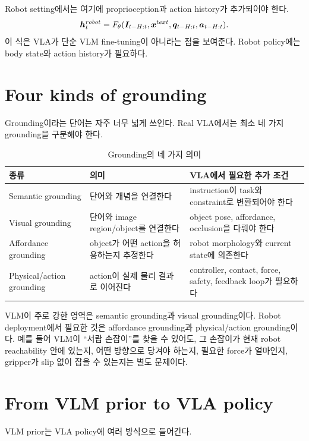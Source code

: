 Robot setting에서는 여기에 proprioception과 action history가 추가되어야 한다.
\begin{equation}
  \bm{h}^{robot}_t
  =
  F_{\theta}(\bm{I}_{t-H:t},\bm{x}^{text},\bm{q}_{t-H:t},\bm{a}_{t-H:t}).
  \label{eq:robot-multimodal-fusion}
\end{equation}
이 식은 VLA가 단순 VLM fine-tuning이 아니라는 점을 보여준다. Robot policy에는 body state와 action history가 필요하다.

\section{Four kinds of grounding}

Grounding이라는 단어는 자주 너무 넓게 쓰인다. Real VLA에서는 최소 네 가지 grounding을 구분해야 한다.

\begin{table}[ht]
\centering
\caption{Grounding의 네 가지 의미}
\label{tab:grounding-types}
\small
\begin{tabularx}{\textwidth}{p{31mm}X X}
\toprule
종류 & 의미 & VLA에서 필요한 추가 조건 \\
\midrule
Semantic grounding & 단어와 개념을 연결한다 & instruction이 task와 constraint로 변환되어야 한다 \\
Visual grounding & 단어와 image region/object를 연결한다 & object pose, affordance, occlusion을 다뤄야 한다 \\
Affordance grounding & object가 어떤 action을 허용하는지 추정한다 & robot morphology와 current state에 의존한다 \\
Physical/action grounding & action이 실제 물리 결과로 이어진다 & controller, contact, force, safety, feedback loop가 필요하다 \\
\bottomrule
\end{tabularx}
\end{table}

VLM이 주로 강한 영역은 semantic grounding과 visual grounding이다. Robot deployment에서 필요한 것은 affordance grounding과 physical/action grounding이다. 예를 들어 VLM이 ``서랍 손잡이''를 찾을 수 있어도, 그 손잡이가 현재 robot reachability 안에 있는지, 어떤 방향으로 당겨야 하는지, 필요한 force가 얼마인지, gripper가 slip 없이 잡을 수 있는지는 별도 문제이다.

\section{From VLM prior to VLA policy}

VLM prior는 VLA policy에 여러 방식으로 들어간다.

